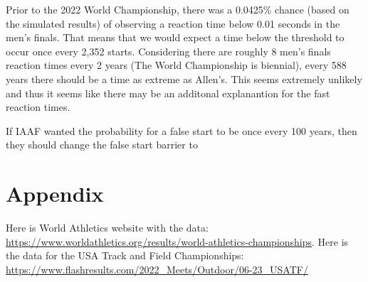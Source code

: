 \documentclass[12pt, letterpaper, titlepage]{article}
\begin{document}
Prior to the 2022 World Championship, there was a 0.0425\% chance (based on the
simulated results) of observing a reaction time below 0.01 seconds in the men's
finals.  That means that we would expect a time below the threshold to occur
once every 2,352 starts.  Considering there are roughly 8 men's finals reaction
times every 2 years (The World Championship is biennial), every 588 years there
should be a time as extreme as Allen's.  This seems extremely unlikely and thus
it seems like there may be an additonal explanantion for the fast reaction times.

If IAAF wanted the probability for a false start to be once every 100 years,
then they should change the false start barrier to 


\section{Appendix}
\label{sec:appendix}
Here is World Athletics website with the data: \url{https://www.worldathletics.org/results/world-athletics-championships}.
Here is the data for the USA Track and Field Championships: \url{https://www.flashresults.com/2022_Meets/Outdoor/06-23_USATF/}




\end{document}
